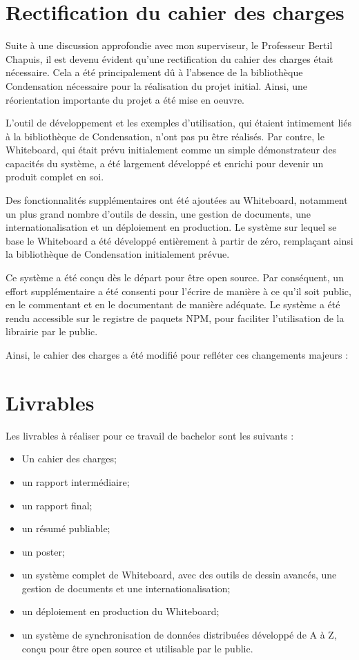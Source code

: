 \section*{Rectification du cahier des charges}

Suite à une discussion approfondie avec mon superviseur, le Professeur Bertil Chapuis, il est devenu évident qu'une rectification du cahier des charges était nécessaire. Cela a été principalement dû à l'absence de la bibliothèque Condensation nécessaire pour la réalisation du projet initial. Ainsi, une réorientation importante du projet a été mise en oeuvre.

L'outil de développement et les exemples d'utilisation, qui étaient intimement liés à la bibliothèque de Condensation, n'ont pas pu être réalisés. Par contre, le Whiteboard, qui était prévu initialement comme un simple démonstrateur des capacités du système, a été largement développé et enrichi pour devenir un produit complet en soi.

Des fonctionnalités supplémentaires ont été ajoutées au Whiteboard, notamment un plus grand nombre d'outils de dessin, une gestion de documents, une internationalisation et un déploiement en production. Le système sur lequel se base le Whiteboard a été développé entièrement à partir de zéro, remplaçant ainsi la bibliothèque de Condensation initialement prévue.

Ce système a été conçu dès le départ pour être open source. Par conséquent, un effort supplémentaire a été consenti pour l'écrire de manière à ce qu'il soit public, en le commentant et en le documentant de manière adéquate. Le système a été rendu accessible sur le registre de paquets NPM, pour faciliter l'utilisation de la librairie par le public.

Ainsi, le cahier des charges a été modifié pour refléter ces changements majeurs :
\section*{Livrables}

Les livrables à réaliser pour ce travail de bachelor sont les suivants :

\begin{itemize}
    \item Un cahier des charges;
    \item un rapport intermédiaire;
    \item un rapport final;
    \item un résumé publiable;
    \item un poster;
    \item un système complet de Whiteboard, avec des outils de dessin avancés, une gestion de documents et une internationalisation;
    \item un déploiement en production du Whiteboard;
    \item un système de synchronisation de données distribuées développé de A à Z, conçu pour être open source et utilisable par le public.
\end{itemize}


